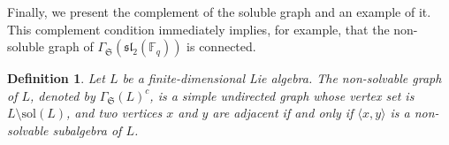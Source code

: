 \documentclass[11pt]{amsart}
\theoremstyle{plain}
\newtheorem{definition}{Definition}[section]
\def\F{\mathbb{F}}
\def\sol{\mathrm{sol}}
\begin{document}
\quad


Finally, we present the complement of the soluble graph and an example of it.  This complement condition immediately implies, for example, that the non-soluble graph of $\Gamma_\mathfrak{S}(\mathfrak{sl}_2(\F_q))$ is connected. 

\begin{definition}
Let $L$ be a finite-dimensional Lie algebra. The non-solvable graph of $L$, denoted by $\Gamma_{\mathfrak{S}}(L)^c$, is a simple undirected graph whose vertex set is $L\setminus \sol(L)$, and two vertices $x$ and $y$ are adjacent if and only if $\langle x, y\rangle$ is a non-solvable subalgebra of $L$.    
\end{definition}
\end{document}
